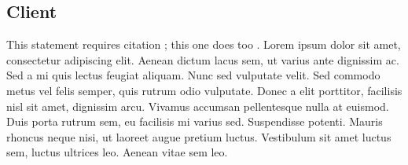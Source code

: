 \documentclass[a4paper, 11pt]{article} %
\begin{document}
\subsection{Client}

This statement requires citation \cite{Smith:2012qr}; this one does too \cite{Smith:2013jd}. Lorem ipsum dolor sit amet, consectetur adipiscing elit. Aenean dictum lacus sem, ut varius ante dignissim ac. Sed a mi quis lectus feugiat aliquam. Nunc sed vulputate velit. Sed commodo metus vel felis semper, quis rutrum odio vulputate. Donec a elit porttitor, facilisis nisl sit amet, dignissim arcu. Vivamus accumsan pellentesque nulla at euismod. Duis porta rutrum sem, eu facilisis mi varius sed. Suspendisse potenti. Mauris rhoncus neque nisi, ut laoreet augue pretium luctus. Vestibulum sit amet luctus sem, luctus ultrices leo. Aenean vitae sem leo.



\newpage




\nocite{*}

\end{document}
